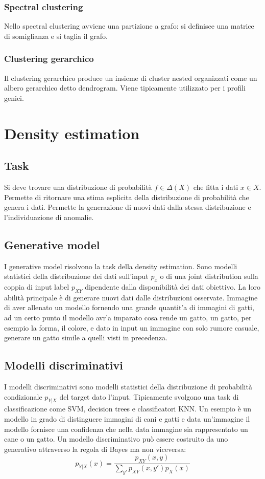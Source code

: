 	\subsubsection{Spectral clustering}
	Nello spectral clustering avviene una partizione a grafo: si definisce una matrice di somiglianza e si taglia il grafo.
	
	\subsubsection{Clustering gerarchico}
	Il clustering gerarchico produce un insieme di cluster nested organizzati come un albero gerarchico detto dendrogram.
	Viene tipicamente utilizzato per i profili genici.

\section{Density estimation}

	\subsection{Task}
	Si deve trovare una distribuzione di probabilit\`a $f\in \Delta(X)$ che fitta i dati $x\in X$.
	Permette di ritornare una stima esplicita della distribuzione di probabilit\`a che genera i dati.
	Permette la generazione di nuovi dati dalla stessa distribuzione e l'individuazione di anomalie.
	
	\subsection{Generative model}
	I generative model risolvono la task della density estimation.
	Sono modelli statistici della distribuzione dei dati sull'input $p_x$ o di una joint distribution sulla coppia di input label $p_{XY}$ dipendente dalla disponibilit\`a dei dati obiettivo.
	La loro abilit\`a principale \`e di generare nuovi dati dalle distribuzioni osservate. 
	Immagine di aver allenato un modello fornendo una grande quantit'a di immagini di gatti, ad un certo punto il modello avr'a imparato cosa rende un gatto, un gatto, per esempio la forma, il colore, e dato in input un immagine con solo rumore casuale, generare un gatto simile a quelli visti in precedenza.
	
	\subsection{Modelli discriminativi}
	I modelli discriminativi sono modelli statistici della distribuzione di probabilit\`a condizionale $p_{Y|X}$ del target dato l'input.
	Tipicamente svolgono una task di classificazione come SVM, decision trees e classificatori KNN. 
	Un esempio \`e un modello in grado di distinguere immagini di cani e gatti e data un'immagine il modello fornisce una confidenza che nella data immagine sia rappresentato un cane o un gatto.
	Un modello discriminativo pu\`o essere costruito da uno generativo attraverso la regola di Bayes ma non viceversa:
	$$p_{Y|X}(x) = \dfrac{p_{XY}(x,y)}{\sum\limits_{y'}p_{XY}(x,y')p_X(x)}$$
	
